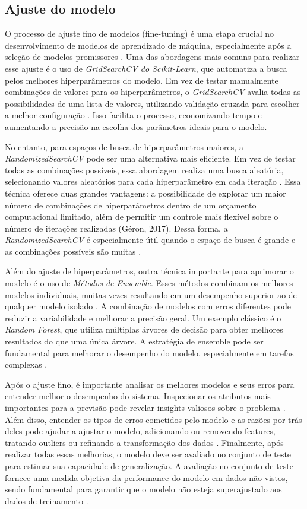 \subsection{Ajuste do modelo}

O processo de ajuste fino de modelos (fine-tuning) é uma etapa crucial no desenvolvimento de modelos de aprendizado de máquina, especialmente após a seleção de modelos promissores \cite{geron2017}. Uma das abordagens mais comuns para realizar esse ajuste é o uso de \textit{GridSearchCV do Scikit-Learn}, que automatiza a busca pelos melhores hiperparâmetros do modelo. Em vez de testar manualmente combinações de valores para os hiperparâmetros, o \textit{GridSearchCV} avalia todas as possibilidades de uma lista de valores, utilizando validação cruzada para escolher a melhor configuração \cite{geron2017}. Isso facilita o processo, economizando tempo e aumentando a precisão na escolha dos parâmetros ideais para o modelo.

No entanto, para espaços de busca de hiperparâmetros maiores, a \textit{RandomizedSearchCV} pode ser uma alternativa mais eficiente. Em vez de testar todas as combinações possíveis, essa abordagem realiza uma busca aleatória, selecionando valores aleatórios para cada hiperparâmetro em cada iteração \cite{geron2017}. Essa técnica oferece duas grandes vantagens: a possibilidade de explorar um maior número de combinações de hiperparâmetros dentro de um orçamento computacional limitado, além de permitir um controle mais flexível sobre o número de iterações realizadas (Géron, 2017). Dessa forma, a \textit{RandomizedSearchCV} é especialmente útil quando o espaço de busca é grande e as combinações possíveis são muitas \cite{geron2017}.

Além do ajuste de hiperparâmetros, outra técnica importante para aprimorar o modelo é o uso de \textit{Métodos de Ensemble}. Esses métodos combinam os melhores modelos individuais, muitas vezes resultando em um desempenho superior ao de qualquer modelo isolado \cite{geron2017}. A combinação de modelos com erros diferentes pode reduzir a variabilidade e melhorar a precisão geral. Um exemplo clássico é o \textit{Random Forest}, que utiliza múltiplas árvores de decisão para obter melhores resultados do que uma única árvore. A estratégia de ensemble pode ser fundamental para melhorar o desempenho do modelo, especialmente em tarefas complexas \cite{geron2017}.

Após o ajuste fino, é importante analisar os melhores modelos e seus erros para entender melhor o desempenho do sistema. Inspecionar os atributos mais importantes para a previsão pode revelar insights valiosos sobre o problema \cite{muller2017}. Além disso, entender os tipos de erros cometidos pelo modelo e as razões por trás deles pode ajudar a ajustar o modelo, adicionando ou removendo features, tratando outliers ou refinando a transformação dos dados \cite{muller2017}. Finalmente, após realizar todas essas melhorias, o modelo deve ser avaliado no conjunto de teste para estimar sua capacidade de generalização. A avaliação no conjunto de teste fornece uma medida objetiva da performance do modelo em dados não vistos, sendo fundamental para garantir que o modelo não esteja superajustado aos dados de treinamento \cite{muller2017}.

